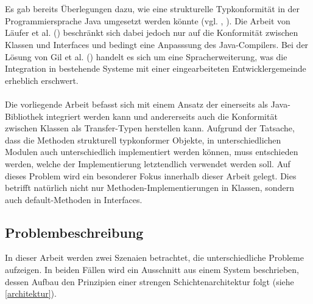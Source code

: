 \documentclass[11pt, 
ngerman,
doublespacing,
chapterinoneline, %
consistentlayout, %
]{scrartcl}
\begin{document}
\\\\
Es gab bereits Überlegungen dazu, wie eine strukturelle Typkonformität in der Program\-mier\-sprache Java umgesetzt werden könnte (vgl. \cite{whiteoak}, \cite{structconfjava}). Die Arbeit von Läufer et al. (\cite{structconfjava}) beschränkt sich dabei jedoch nur auf die Konformität zwischen Klassen und Interfaces und bedingt eine Anpasssung des Java-Compilers. Bei der Lösung von Gil et al. (\cite{whiteoak}) handelt es sich um eine Spracherweiterung, was die Integration in bestehende Systeme mit einer eingearbeiteten Entwicklergemeinde erheblich erschwert.
\\\\ 
Die vorliegende Arbeit befasst sich mit einem Ansatz der einerseits als Java-Bibliothek integriert werden kann und andererseits auch die Konformität zwischen Klassen als Transfer-Typen herstellen kann. 
Aufgrund der Tatsache, dass die Methoden strukturell typkonformer Objekte, in unterschiedlichen Modulen auch unterschiedlich implementiert werden können, muss entschieden werden, welche der Implementierung letztendlich ver\-wendet werden soll. Auf dieses Problem wird ein besonderer Fokus innerhalb dieser Arbeit gelegt.
Dies betrifft natürlich nicht nur Methoden-Implementierungen in Klassen, sondern auch default-Methoden in Interfaces.

\subsection{Problembeschreibung}\label{problembeschreibung}
In dieser Arbeit werden zwei Szenaien betrachtet, die unterschiedliche Probleme aufzeigen. In beiden Fällen wird ein Ausschnitt aus einem System beschrieben, dessen Aufbau den Prinzipien einer strengen Schichtenarchitektur folgt  (siehe \ref{architektur}).
\end{document}
